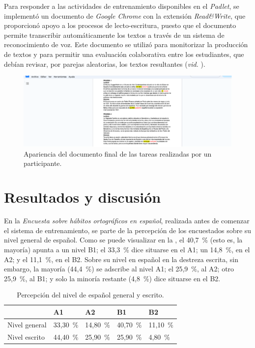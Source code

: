\documentclass[spanish]{textolivre}
\begin{document}
Para responder a las actividades de entrenamiento disponibles en el \textit{Padlet}, se implementó un documento de \textit{Google Chrome} con la extensión \textit{Read\&Write}, que proporcionó apoyo a los procesos de lecto-escritura, puesto que el documento permite transcribir automáticamente los textos a través de un sistema de reconocimiento de voz. Este documento se utilizó para monitorizar la producción de textos y para permitir una evaluación colaborativa entre los estudiantes, que debían revisar, por parejas aleatorias, los textos resultantes (\textit{vid.} ).

\begin{figure}
    \centering
    \begin{minipage}{.85\textwidth}
    \includegraphics[width=\linewidth]{Fig2.png}
    \caption{Apariencia del documento final de las tareas realizadas por un participante.}\label{fig2}
    \end{minipage}
\end{figure}

\section{Resultados y discusión}\label{sec-idioma}
En la \textit{Encuesta sobre hábitos ortográficos en español}, realizada antes de comenzar el sistema de entrenamiento, se parte de la percepción de los encuestados sobre su nivel general de español. Como se puede visualizar en la , el 40,7~\% (esto es, la mayoría) apunta a un nivel B1; el 33,3~\% dice situarse en el A1; un 14,8~\%, en el A2; y el 11,1~\%, en el B2. Sobre su nivel en español en la destreza escrita, sin embargo, la mayoría (44,4~\%) se adscribe al nivel A1; el 25,9~\%, al A2; otro 25,9~\%, al B1; y solo la minoría restante (4,8~\%) dice situarse en el B2.

\begin{table}[htbp]
\centering
\begin{threeparttable}
\caption{Percepción del nivel de español general y escrito.}
\label{tb1}
\begin{tabular}{lllll}
\toprule
& A1 & A2 & B1 & B2 \\ 
\midrule
Nivel general & 33,30~\% & 14,80~\% & 40,70~\% & 11,10~\% \\
Nivel escrito & 44,40~\% & 25,90~\% & 25,90~\% & 4,80~\% \\
\bottomrule
\end{tabular}
\end{threeparttable}
\end{table}
\end{document}
